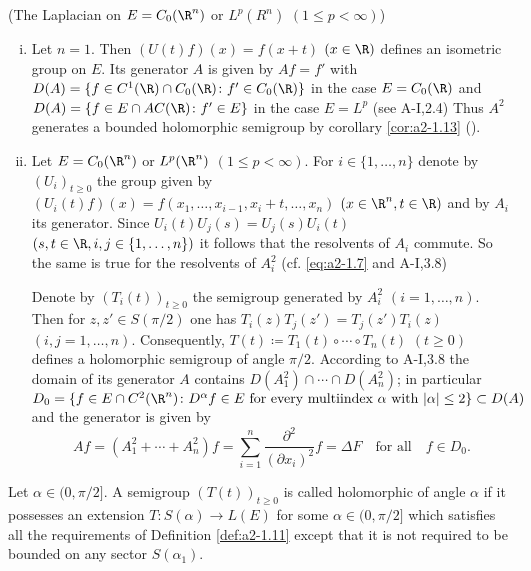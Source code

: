 \begin{example*}\label{ex:a2-1.13-kgk}(The Laplacian on $E = C_{0}(\R^{n})$ or $L^{p}(R^{n})$ $(1 \leq p < \infty)$)
\begin{enumerate}[(i), wide]
\item \label{ex:a2-1.13-kgk-1}
Let $n = 1$.
Then $(U(t)f)(x) = f(x+t)$ $(x \in \R)$ defines an isometric group on $E$.
Its generator $A$ is given by $Af = f'$ with 
$D(A) = \{f \in C^{1}(\R) \cap C_{0}(\R) \colon f' \in C_{0}(\R)\}$ in the case $E = C_{0}(\R)$ and 
$D(A) = \{f \in E \cap AC(\R) \colon f' \in E\}$ in the case $E = L^{p}$ (see A-I,2.4)
Thus $A^{2}$ generates a bounded holomorphic semigroup by corollary \ref{cor:a2-1.13} ().

\item \label{ex:a2-1.13-kgk-2}
Let $E = C_{0}(\R^{n})$ or $L^{p}(\R^{n})$ $(1 \leq p < \infty)$.
For $i \in \{1,\ldots,n\}$ denote by $(U_{i})_{t \geq 0}$ the group given by 
$(U_{i}(t)f)(x) = f(x_{1},\ldots,x_{i-1},x_{i}+t,\ldots,x_{n})$ $(x \in \R^{n}, t \in \R)$ 
and by $A_{i}$ its generator.
Since $U_{i}(t)U_{j}(s) = U_{j}(s)U_{i}(t)$ $(s,t \in \R, i,j \in \{1,\ldots,n\})$ it follows that the resolvents of $A_{i}$ commute.
So the same is true for the resolvents of $A_{i}^{2}$ (cf. \eqref{eq:a2-1.7} and A-I,3.8)

Denote by $(T_{i}(t))_{t \geq 0}$ 
the semigroup generated by $A_{i}^{2}$ $(i=1,\ldots,n)$.
Then for $z,z' \in S(\pi/2)$ one has $T_{i}(z)T_{j}(z') = T_{j}(z')T_{i}(z)$ $(i,j=1,\ldots,n)$.
Consequently, $T(t) \coloneqq T_{1}(t) \circ \cdots \circ T_{n}(t)$ $(t \geq 0)$ defines a holomorphic semigroup of angle $\pi/2$.
According to A-I,3.8 the domain of its generator $A$ contains $D(A_{1}^{2}) \cap \cdots \cap D(A_{n}^{2})$; in particular $D_{0} = \{f \in E \cap C^{2}(\R^{n}) \colon D^{\alpha}f \in E \text{ for every multiindex } \alpha \text{ with } |\alpha| \leq 2\} \subset D(A)$ 
and the generator is given by
\[
    Af = (A_{1}^{2} + \cdots + A_{n}^{2})f =
    \sum_{i = 1}^{n} \frac{\partial^{2}}{(\partial x_{i})^{2}} f
    = \Delta F \quad \text{for all} \quad f \in D_{0}.
\]
\end{enumerate}
\end{example*}
Let $\alpha \in (0,\pi/2]$.
A semigroup $(T(t))_{t \geq 0}$ is called holomorphic of angle $\alpha$ if it possesses an extension $T \colon S(\alpha) \to L(E)$ for some $\alpha \in (0,\pi/2]$ which satisfies all the requirements of Definition \ref{def:a2-1.11} except that it is not required to be bounded on any sector $S(\alpha_{1})$.

